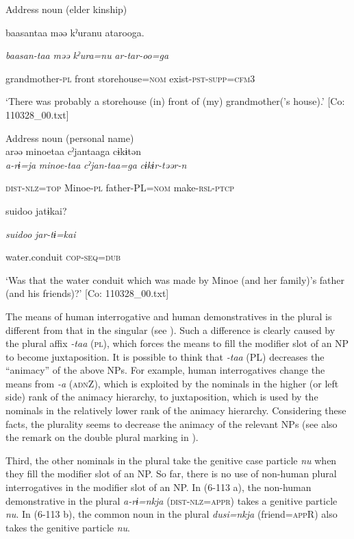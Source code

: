  \ex Address noun (elder kinship)\\
\gll

{\US}
baasantaa  məə  kˀuranu  atarooga.

      \textit{baasan-taa}  \textit{məə}  \textit{kˀura=nu}  \textit{ar-tar-oo=ga}

      grandmother-\textsc{pl}  front  storehouse=\textsc{nom}  exist-\textsc{pst}-\textsc{supp}=\textsc{cfm}3

\glt ‘There was probably a storehouse (in) front of (my) grandmother(’s house).’ [Co: 110328\_00.txt]
\z

 \ex Address noun (personal name)\\
{\TM}
\gll  arəə  minoetaa  cˀjantaaga  cɨkɨtən\\

      \textit{a-rɨ=ja}  \textit{minoe-taa}  \textit{cˀjan-taa=ga}  \textit{cɨkɨr-təər-n}

      \textsc{dist}-\textsc{nlz}=\textsc{top}  Minoe-\textsc{pl}  father-PL=\textsc{nom}  make-\textsc{rsl}-\textsc{ptcp}

      {\textbar}suidoo{\textbar}  jatɨkai?

      \textit{suidoo}  \textit{jar-tɨ=kai}

      water.conduit  \textsc{cop}-\textsc{seq}=\textsc{dub}

\glt ‘Was that the water conduit which was made by Minoe (and her family)’s father (and his friends)?’ [Co: 110328\_00.txt]
\z

The means of human interrogative and human demonstratives in the plural is different from that in the singular (see ). Such a difference is clearly caused by the plural affix \textit{{}-taa} (\textsc{pl}), which forces the means to fill the modifier slot of an NP to become juxtaposition. It is possible to think that \textit{{}-taa} (PL) decreases the “animacy” of the above NPs. For example, human interrogatives change the means from \textit{{}-a} (\textsc{adn}Z), which is exploited by the nominals in the higher (or left side) rank of the animacy hierarchy, to juxtaposition, which is used by the nominals in the relatively lower rank of the animacy hierarchy. Considering these facts, the plurality seems to decrease the animacy of the relevant NPs (see also the remark on the double plural marking in ).

  Third, the other nominals in the plural take the genitive case particle \textit{nu} when they fill the modifier slot of an NP. So far, there is no use of non-human plural interrogatives in the modifier slot of an NP. In (6-113 a), the non-human demonstrative in the plural \textit{a-rɨ=nkja} (\textsc{dist}-\textsc{nlz}=\textsc{appr}) takes a genitive particle \textit{nu}. In (6-113 b), the common noun in the plural \textit{dusi=nkja} (friend=\textsc{app}R) also takes the genitive particle \textit{nu}.


